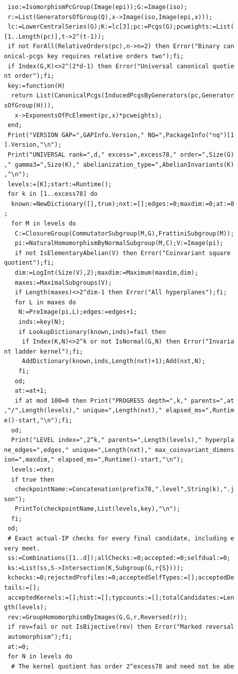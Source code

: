 \documentclass[
  11pt,
  a4paper,
]{article}
\begin{document}
\begin{verbatim}
 iso:=IsomorphismPcGroup(Image(epi));G:=Image(iso);
 r:=List(GeneratorsOfGroup(Q),x->Image(iso,Image(epi,x)));
 lc:=LowerCentralSeries(G);K:=lc[3];pc:=Pcgs(G);pcweights:=List(
[1..Length(pc)],t->2^(t-1));
 if not ForAll(RelativeOrders(pc),n->n=2) then Error("Binary can
onical-pcgs key requires relative orders two");fi;
 if Index(G,K)<>2^(2*d-1) then Error("Universal canonical quotie
nt order");fi;
 key:=function(H)
  return List(CanonicalPcgs(InducedPcgsByGenerators(pc,Generator
sOfGroup(H))),
   x->ExponentsOfPcElement(pc,x)*pcweights);
 end;
 Print("VERSION GAP=",GAPInfo.Version," NQ=",PackageInfo("nq")[1
].Version,"\n");
 Print("UNIVERSAL rank=",d," excess=",excess78," order=",Size(G)
," gamma3=",Size(K)," abelianization_type=",AbelianInvariants(K)
,"\n");
 levels:=[K];start:=Runtime();
 for k in [1..excess78] do
  known:=NewDictionary([],true);nxt:=[];edges:=0;maxdim:=0;at:=0
;
  for M in levels do
   C:=ClosureGroup(CommutatorSubgroup(M,G),FrattiniSubgroup(M));
   pi:=NaturalHomomorphismByNormalSubgroup(M,C);V:=Image(pi);
   if not IsElementaryAbelian(V) then Error("Coinvariant square 
quotient");fi;
   dim:=LogInt(Size(V),2);maxdim:=Maximum(maxdim,dim);
   maxes:=MaximalSubgroups(V);
   if Length(maxes)<>2^dim-1 then Error("All hyperplanes");fi;
   for L in maxes do
    N:=PreImage(pi,L);edges:=edges+1;
    inds:=key(N);
    if LookupDictionary(known,inds)=fail then
     if Index(K,N)<>2^k or not IsNormal(G,N) then Error("Invaria
nt ladder kernel");fi;
     AddDictionary(known,inds,Length(nxt)+1);Add(nxt,N);
    fi;
   od;
   at:=at+1;
   if at mod 100=0 then Print("PROGRESS depth=",k," parents=",at
,"/",Length(levels)," unique=",Length(nxt)," elapsed_ms=",Runtim
e()-start,"\n");fi;
  od;
  Print("LEVEL index=",2^k," parents=",Length(levels)," hyperpla
ne_edges=",edges," unique=",Length(nxt)," max_coinvariant_dimens
ion=",maxdim," elapsed_ms=",Runtime()-start,"\n");
  levels:=nxt;
  if true then
   checkpointName:=Concatenation(prefix78,".level",String(k),".j
son");
   PrintTo(checkpointName,List(levels,key),"\n");
  fi;
 od;
 # Exact actual-IP checks for every final candidate, including e
very meet.
 ss:=Combinations([1..d]);allChecks:=0;accepted:=0;selfdual:=0;
 ks:=List(ss,S->Intersection(K,Subgroup(G,r{S})));
 kchecks:=0;rejectedProfiles:=0;acceptedSelfTypes:=[];acceptedDe
tails:=[];
 acceptedKernels:=[];hist:=[];typcounts:=[];totalCandidates:=Len
gth(levels);
 rev:=GroupHomomorphismByImages(G,G,r,Reversed(r));
 if rev=fail or not IsBijective(rev) then Error("Marked reversal
 automorphism");fi;
 at:=0;
 for N in levels do
  # The kernel quotient has order 2^excess78 and need not be abe

\end{verbatim}
\end{document}
